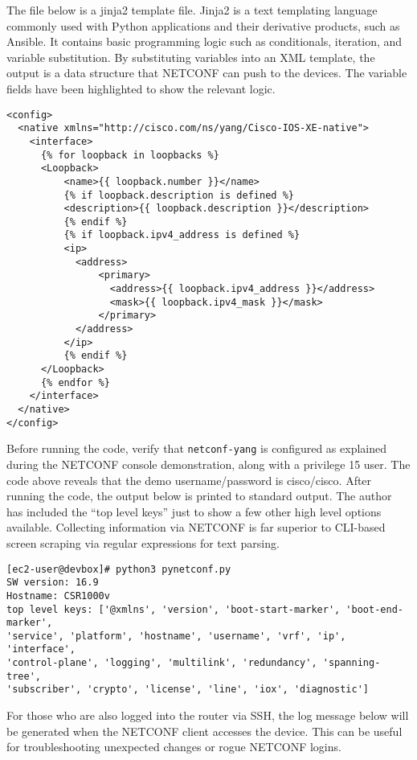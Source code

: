 The file below is a jinja2 template file. Jinja2 is a text templating language
commonly used with Python applications and their derivative products, such as
Ansible. It contains basic programming logic such as conditionals, iteration,
and variable substitution. By substituting variables into an XML template, the
output is a data structure that NETCONF can push to the devices. The variable
fields have been highlighted to show the relevant logic.

\begin{verbatim}
<config>
  <native xmlns="http://cisco.com/ns/yang/Cisco-IOS-XE-native">
    <interface>
      {% for loopback in loopbacks %}
      <Loopback>
          <name>{{ loopback.number }}</name>
          {% if loopback.description is defined %}
          <description>{{ loopback.description }}</description>
          {% endif %}
          {% if loopback.ipv4_address is defined %}
          <ip>
            <address>
                <primary>
                  <address>{{ loopback.ipv4_address }}</address>
                  <mask>{{ loopback.ipv4_mask }}</mask>
                </primary>
            </address>
          </ip>
          {% endif %}
      </Loopback>
      {% endfor %}
    </interface>
  </native>
</config>
\end{verbatim}

Before running the code, verify that \verb|netconf-yang| is configured as
explained during the NETCONF console demonstration, along with a privilege 15
user. The code above reveals that the demo username/password is cisco/cisco.
After running the code, the output below is printed to standard output. The
author has included the ``top level keys'' just to show a few other high level
options available. Collecting information via NETCONF is far superior to
CLI-based screen scraping via regular expressions for text parsing.

\begin{verbatim}
[ec2-user@devbox]# python3 pynetconf.py 
SW version: 16.9
Hostname: CSR1000v
top level keys: ['@xmlns', 'version', 'boot-start-marker', 'boot-end-marker',
'service', 'platform', 'hostname', 'username', 'vrf', 'ip', 'interface',
'control-plane', 'logging', 'multilink', 'redundancy', 'spanning-tree',
'subscriber', 'crypto', 'license', 'line', 'iox', 'diagnostic']
\end{verbatim}

For those who are also logged into the router via SSH, the log message below
will be generated when the NETCONF client accesses the device. This can be
useful for troubleshooting unexpected changes or rogue NETCONF logins.

